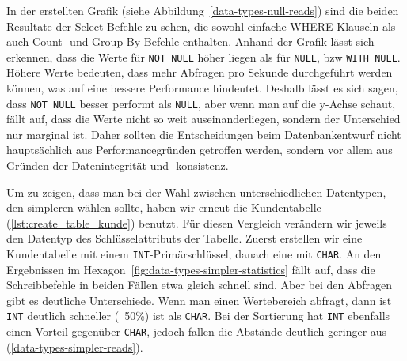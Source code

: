 In der erstellten Grafik (siehe Abbildung~\ref{data-types-null-reads}) sind die beiden Resultate der Select-Befehle zu sehen, die sowohl einfache WHERE-Klauseln als auch Count- und Group-By-Befehle enthalten.
Anhand der Grafik lässt sich erkennen, dass die Werte für \texttt{NOT NULL} höher liegen als für \texttt{NULL}, bzw \texttt{WITH NULL}.
Höhere Werte bedeuten, dass mehr Abfragen pro Sekunde durchgeführt werden können, was auf eine bessere Performance hindeutet.
Deshalb lässt es sich sagen, dass \texttt{NOT NULL} besser performt als \texttt{NULL}, aber wenn man auf die y-Achse schaut, fällt auf, dass die Werte nicht so weit auseinanderliegen, sondern der Unterschied nur marginal ist.
Daher sollten die Entscheidungen beim Datenbankentwurf nicht hauptsächlich aus Performancegründen getroffen werden, sondern vor allem aus Gründen der Datenintegrität und -konsistenz.

Um zu zeigen, dass man bei der Wahl zwischen unterschiedlichen Datentypen, den simpleren wählen sollte, haben wir erneut die Kundentabelle (\ref{lst:create_table_kunde}) benutzt.
Für diesen Vergleich verändern wir jeweils den Datentyp des Schlüsselattributs der Tabelle.
Zuerst erstellen wir eine Kundentabelle mit einem \texttt{INT}-Primärschlüssel, danach eine mit \texttt{CHAR}.
An den Ergebnissen im Hexagon~\ref{fig:data-types-simpler-statistics} fällt auf, dass die Schreibbefehle in beiden Fällen etwa gleich schnell sind.
Aber bei den Abfragen gibt es deutliche Unterschiede.
Wenn man einen Wertebereich abfragt, dann ist \texttt{INT} deutlich schneller (~50\%) ist als \texttt{CHAR}.
Bei der Sortierung hat \texttt{INT} ebenfalls einen Vorteil gegenüber \texttt{CHAR}, jedoch fallen die Abstände deutlich geringer aus (\ref{data-types-simpler-reads}).

